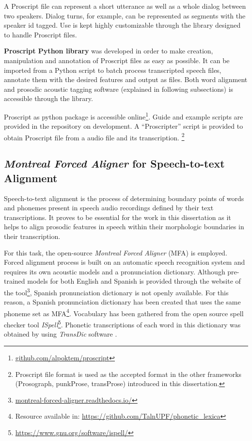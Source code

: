 A Proscript file can represent a short utterance as well as a whole dialog between two speakers. Dialog turns, for example, can be represented as segments with the speaker id tagged. Use is kept highly customizable through the library designed to handle Proscript files. 

\textbf{Proscript Python library} was developed in order to make creation, manipulation and annotation of Proscript files as easy as possible. It can be imported from a Python script to batch process transcripted speech files, annotate them with the desired features and output as files. Both word alignment and prosodic acoustic tagging software (explained in following subsections) is accessible through the library. 

Proscript as python package is accessible online\footnote{\url{github.com/alpoktem/proscript}}. Guide and example scripts are provided in the repository on development. A ``Proscripter'' script is provided to obtain Proscript file from a audio file and its transcription. \footnote{Proscript file format is used as the accepted format in the other frameworks (Prosograph, punkProse, transProse) introduced in this dissertation.}

\subsection*{\textit{Montreal Forced Aligner} for Speech-to-text Alignment}
Speech-to-text alignment is the process of determining boundary points of words and phonemes present in speech audio recordings defined by their text transcriptions. It proves to be essential for the work in this dissertation as it helps to align prosodic features in speech within their morphologic boundaries in their transcription. 

For this task, the open-source \textit{Montreal Forced Aligner} (MFA) \citep{mfa} is employed. Forced alignment process is built on an automatic speech recognition system and requires its own acoustic models and a pronunciation dictionary. Although pre-trained models for both English and Spanish is provided through the website of the tool\footnote{\url{montreal-forced-aligner.readthedocs.io/}}, Spanish pronunciation dictionary is not openly available. For this reason, a Spanish pronunciation dictionary has been created that uses the same phoneme set as MFA\footnote{Resource available in: \url{https://github.com/TalnUPF/phonetic_lexica}}. Vocabulary has been gathered from the open source spell checker tool \textit{ISpell}\footnote{\url{https://www.gnu.org/software/ispell/}}. Phonetic transcriptions of each word in this dictionary was obtained by using \textit{TransDic} software \citep{Garrido2018}.

